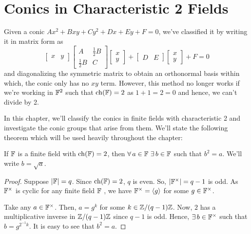 \chapter{Conics in Characteristic 2 Fields} \label{ch:char2}

Given a conic $Ax^2 + Bxy + Cy^2 + Dx + Ey + F = 0$, we've classified it by
writing it in matrix form as
\[
    \begin{bmatrix}x & y\end{bmatrix}
    \begin{bmatrix}A & \frac{1}{2}B \\ \frac{1}{2}B & C\end{bmatrix}
    \begin{bmatrix}x \\ y\end{bmatrix}
    +
    \begin{bmatrix}D & E\end{bmatrix}
    \begin{bmatrix}x \\ y\end{bmatrix}
    + F = 0
\]
and diagonalizing the symmetric matrix to obtain an orthonormal basis within
which, the conic only has no $xy$ term. However, this method no longer works if
we're working in $\mathbb{F}^2$ such that $\operatorname{ch}(\mathbb{F})=2$ as $1+1=2=0$ and hence, we
can't divide by 2.

\vspace{1ex}

In this chapter, we'll classify the conics in finite fields with characteristic 2
and investigate the conic groups that arise from them. We'll state the following
theorem which will be used heavily throughout the chapter:

\begin{theorem} \label{thm:field_sq}
    If $\mathbb{F}$ is a finite field with $\operatorname{ch}(\mathbb{F})=2$, then
    $\forall\,a\in\mathbb{F}\ \exists\,b\in\mathbb{F}$ such that $b^2=a$. We'll write
    $b=\sqrt{a}$.
\end{theorem}

\begin{proof}
    Suppose $|\mathbb{F}|=q$. Since $\operatorname{ch}(\mathbb{F})=2$, $q$ is even. So, $|\mathbb{F}^\times|=q-1$ is
    odd. As $\mathbb{F}^\times$ is cyclic for any finite field $\mathbb{F}$
    \cite[Ch.~9 Prop.~18]{dummit}, we have $\mathbb{F}^\times=\langle g \rangle$ for some
    $g\in\mathbb{F}^\times$.
    \vspace{1ex}

    Take any $a\in\mathbb{F}^\times$. Then, $a=g^k$ for some $k\in\mathbb{Z}/(q-1)\mathbb{Z}$. Now, $2$
    has a multiplicative inverse in $\mathbb{Z}/(q-1)\mathbb{Z}$ since $q-1$ is odd. Hence,
    $\exists\,b\in\mathbb{F}^\times$ such that $b=g^{2^{-1}k}$. It is easy to see that
    $b^2=a$.
\end{proof}

